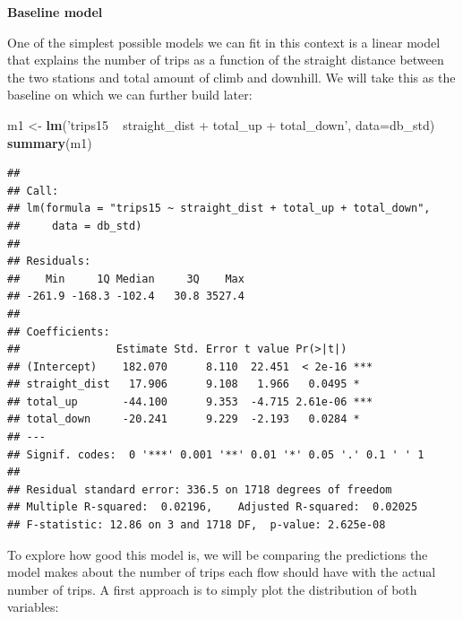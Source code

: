 \documentclass[]{book}
\newenvironment{Shaded}{\begin{snugshade}}{\end{snugshade}}
\newcommand{\DataTypeTok}[1]{\textcolor[rgb]{0.13,0.29,0.53}{#1}}
\newcommand{\DecValTok}[1]{\textcolor[rgb]{0.00,0.00,0.81}{#1}}
\newcommand{\KeywordTok}[1]{\textcolor[rgb]{0.13,0.29,0.53}{\textbf{#1}}}
\newcommand{\NormalTok}[1]{#1}
\newcommand{\OperatorTok}[1]{\textcolor[rgb]{0.81,0.36,0.00}{\textbf{#1}}}
\newcommand{\StringTok}[1]{\textcolor[rgb]{0.31,0.60,0.02}{#1}}
\begin{document}
\textbf{Baseline model}

One of the simplest possible models we can fit in this context is a linear model that explains the number of trips as a function of the straight distance between the two stations and total amount of climb and downhill. We will take this as the baseline on which we can further build later:

\begin{Shaded}
\begin{Highlighting}[]
\NormalTok{m1 <-}\StringTok{ }\KeywordTok{lm}\NormalTok{(}\StringTok{'trips15 ~ straight_dist + total_up + total_down'}\NormalTok{, }\DataTypeTok{data=}\NormalTok{db_std)}
\KeywordTok{summary}\NormalTok{(m1)}
\end{Highlighting}
\end{Shaded}

\begin{verbatim}
## 
## Call:
## lm(formula = "trips15 ~ straight_dist + total_up + total_down", 
##     data = db_std)
## 
## Residuals:
##    Min     1Q Median     3Q    Max 
## -261.9 -168.3 -102.4   30.8 3527.4 
## 
## Coefficients:
##               Estimate Std. Error t value Pr(>|t|)    
## (Intercept)    182.070      8.110  22.451  < 2e-16 ***
## straight_dist   17.906      9.108   1.966   0.0495 *  
## total_up       -44.100      9.353  -4.715 2.61e-06 ***
## total_down     -20.241      9.229  -2.193   0.0284 *  
## ---
## Signif. codes:  0 '***' 0.001 '**' 0.01 '*' 0.05 '.' 0.1 ' ' 1
## 
## Residual standard error: 336.5 on 1718 degrees of freedom
## Multiple R-squared:  0.02196,    Adjusted R-squared:  0.02025 
## F-statistic: 12.86 on 3 and 1718 DF,  p-value: 2.625e-08
\end{verbatim}

To explore how good this model is, we will be comparing the predictions the model makes about the number of trips each flow should have with the actual number of trips. A first approach is to simply plot the distribution of both variables:

\begin{Shaded}
\end{Shaded}
\end{document}
